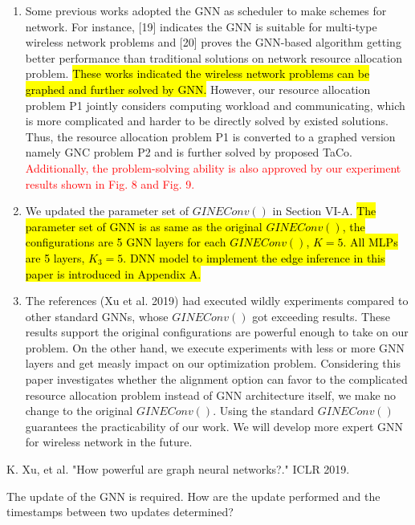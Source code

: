 \documentclass{ar2rc}
\newcommand{\highlight}[1]{\sethlcolor{yellow!50}\hl{#1}}
\begin{document}
\begin{enumerate}
  
   \item Some previous works adopted the GNN as scheduler to make schemes for network. For instance, [19] indicates the GNN is suitable for multi-type wireless network problems and [20] proves the GNN-based algorithm getting better performance than traditional solutions on network resource allocation problem. \highlight{These works indicated the wireless network problems can be graphed and further solved by GNN.} However, our resource allocation problem P1 jointly considers computing workload and communicating, which is more complicated and harder to be directly solved by existed solutions. Thus, the resource allocation problem P1 is converted to a graphed version namely GNC problem P2 and is further solved by proposed TaCo. \textcolor{red}{Additionally, the problem-solving ability is also approved by our experiment results shown in Fig. 8 and Fig. 9.}

   \item We updated the parameter set of $GINEConv()$ in Section VI-A. \highlight{The parameter set of GNN is as same as the original $GINEConv()$, the configurations are 5 GNN layers for each $GINEConv()$, $K=5$. All MLPs are 5 layers, $K_3=5$. DNN model to implement the edge inference in this paper is introduced in Appendix A.}

   \item The references (Xu et al. 2019) had executed wildly experiments compared to other standard GNNs, whose $GINEConv()$ got exceeding results. These results support the original configurations are powerful enough to take on our problem. On the other hand, we execute experiments with less or more GNN layers and get measly impact on our optimization problem. Considering this paper investigates whether the alignment option can favor to the complicated resource allocation problem instead of GNN architecture itself, we make no change to the original $GINEConv()$. Using the standard $GINEConv()$ guarantees the practicability of our work. We will develop more expert GNN for wireless network in the future. 
\end{enumerate}
K. Xu, et al. "How powerful are graph neural networks?." ICLR 2019.


\begin{tcolorbox}[
   title={Reviewer 3: Comment 5},
   colback=gray!10,%
   colframe=black,%
   width=\linewidth,%
   arc=1mm, auto outer arc,
   boxrule=0.5pt,
]
The update of the GNN is required. How are the update performed and the timestamps between two updates determined?
\end{tcolorbox}
\end{document}
